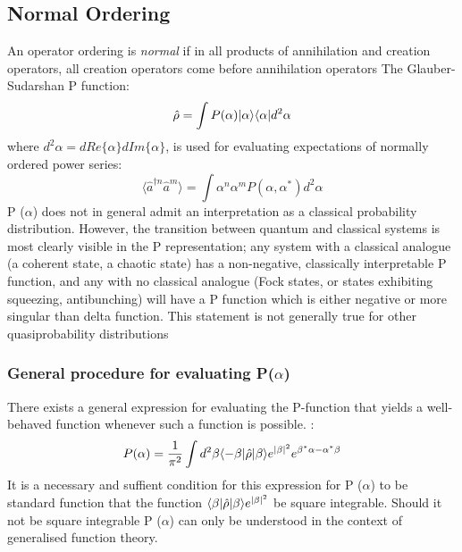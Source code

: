 \subsection{Normal Ordering}
An operator ordering is \emph{normal} if in all products of annihilation and creation operators, all creation operators come before annihilation operators \cite{Mandl2010} The Glauber-Sudarshan P function\cite{Cahill1969}:
\begin{equation}
	\hat{\rho} = \int P(\alpha) | \alpha \rangle \langle \alpha | d^2 \alpha
	\end{equation}
where $d^2 \alpha = dRe\{\alpha \}dIm\{\alpha \}$, is used for evaluating expectations of normally ordered power series:
\begin{equation}
	\langle \hat{a}^{\dagger n} \hat{a}^{m}  \rangle = \int \alpha^n \alpha^m P (\alpha, \alpha^*) d^2 \alpha
\end{equation}
P ($\alpha$) does not in general admit an interpretation as a classical probability distribution.
However, the transition between quantum and classical systems is most clearly visible in the P representation; any system with a classical analogue (a coherent state, a chaotic state) has a non-negative, classically interpretable P function, and any with no classical analogue (Fock states, or states exhibiting squeezing, antibunching) will have a P function which is either negative or more singular than delta function.
This statement is not generally true for other quasiprobability distributions\cite{Mandel1995}
\subsubsection{General procedure for evaluating P($\alpha$)}\label{mehta}
There exists a general expression for evaluating the P-function that yields a well-behaved function whenever such a function is possible.
\cite{Mehta1967}:
\begin{equation}
	P(\alpha) = \frac{1}{\pi^2} \int d^2 \beta \langle-\beta | \hat{\rho} | \beta \rangle e^{|\beta|^2} e^{\beta^* \alpha -\alpha^* \beta}
\end{equation}
It is a necessary and suffient condition for this expression for P ($\alpha$) to be standard function that the function $ \langle\beta | \hat{\rho} | \beta \rangle e^{|\beta|^2} $ be square integrable.
Should it not be square integrable P ($\alpha$) can only be understood in the context of generalised function theory.
